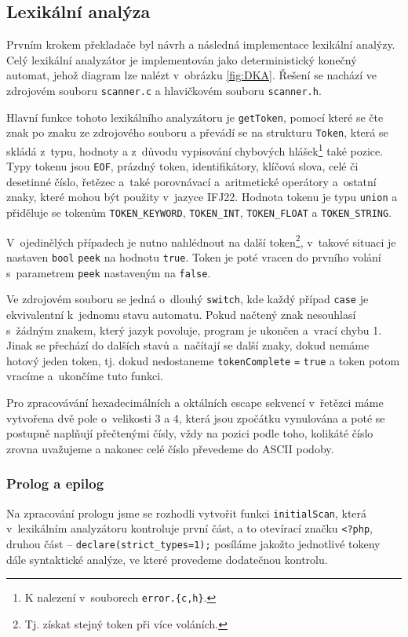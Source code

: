 \documentclass[a4paper,12pt]{article}
\begin{document}
\subsection{Lexikální analýza}
Prvním krokem překladače byl návrh a následná implementace lexikální analýzy. Celý lexikální analyzátor je implementován jako deterministický konečný automat, jehož diagram lze nalézt v~obrázku \ref{fig:DKA}. Řešení se nachází ve zdrojovém souboru \verb|scanner.c| a hlavičkovém souboru \verb|scanner.h|.

Hlavní funkce tohoto lexikálního analyzátoru je \verb|getToken|, pomocí které se čte znak po znaku ze zdrojového souboru a převádí se na strukturu \verb|Token|, která se skládá z~typu, hodnoty a z~důvodu vypisování chybových hlášek\footnote{K nalezení v~souborech \verb|error.{c,h}|.} také pozice. Typy tokenu jsou \verb|EOF|, prázdný token, identifikátory, klíčová slova, celé či desetinné číslo, řetězec a~také porovnávací a~aritmetické operátory a~ostatní znaky, které mohou být použity v~jazyce IFJ22. Hodnota tokenu je typu \verb|union| a přiděluje se tokenům \verb|TOKEN_KEYWORD|, \verb|TOKEN_INT|, \verb|TOKEN_FLOAT| a \verb|TOKEN_STRING|.

V~ojedinělých případech je nutno nahlédnout na další token\footnote{Tj. získat stejný token při více voláních.}, v~takové situaci je nastaven \verb|bool| \verb|peek| na hodnotu \verb|true|. Token je poté vracen do prvního volání s~parametrem \verb|peek| nastaveným na \verb|false|.
 
Ve zdrojovém souboru se jedná o~dlouhý \verb|switch|, kde každý případ \verb|case| je ekvivalentní k~jednomu stavu automatu. Pokud načtený znak nesouhlasí s~žádným znakem, který jazyk povoluje, program je ukončen a~vrací chybu 1. Jinak se přechází do dalších stavů a~načítají se další znaky, dokud nemáme hotový jeden token, tj. dokud nedostaneme \verb|tokenComplete| \verb|=| \verb|true| a token potom vracíme a~ukončíme tuto funkci. 

Pro zpracovávání hexadecimálních a oktálních escape sekvencí v~řetězci máme vytvořena dvě pole o~velikosti 3 a 4, která jsou zpočátku vynulována a poté se postupně
naplňují přečtenými čísly, vždy na pozici podle toho, kolikáté číslo zrovna uvažujeme a nakonec celé číslo převedeme do ASCII podoby.

\subsubsection{Prolog a epilog}
\label{prolog}
Na zpracování prologu jsme se rozhodli vytvořit funkci \verb|initialScan|, která v~lexikálním analyzátoru kontroluje první část, a to otevírací značku \verb|<?php|, druhou část -- \verb|declare(strict_types=1);| posíláme jakožto jednotlivé tokeny dále syntaktické analýze, ve které provedeme dodatečnou kontrolu.
\end{document}
